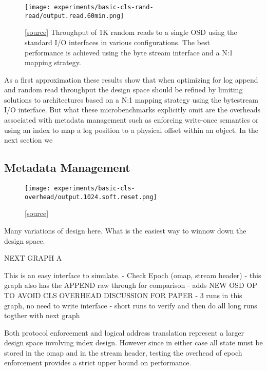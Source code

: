 \documentclass[10pt,twocolumn]{article}
\begin{document}
\begin{figure}[h]
  \centering
  \texttt{[image: experiments/basic-cls-rand-read/output.read.60min.png]}
  \caption{
[\href{https://github.com/noahdesu/zlog-popper/tree/master/experiments/basic-cls-rand-read/visualize.ipynb}{source}]
Throughput of 1K random reads to a single OSD using the standard I/O
interfaces in various configurations. The best performance is achieved using
the byte stream interface and a N:1 mapping strategy.
}
\end{figure}

As a first approximation these results show that when optimizing for log
append and random read throughput the design space should be refined by
limiting solutions to architectures based on a N:1 mapping strategy using the
bytestream I/O interface. But what these microbenchmarks explicitly omit are
the overheads associated with metadata management such as enforcing write-once
semantics or using an index to map a log position to a physical offset within
an object. In the next section we

\subsection{Metadata Management}

\begin{figure}[h]
  \centering
  \texttt{[image: experiments/basic-cls-overhead/output.1024.soft.reset.png]}
  \caption{
[\href{https://github.com/noahdesu/zlog-popper/tree/master/experiments/basic-cls-overhead/visualize.ipynb}{source}]
}
\end{figure}

Many variations of design here. What is the easiest way to 
winnow down the design space.

NEXT GRAPH A

This is an easy interface to simulate.
- Check Epoch (omap, stream header)
- this graph also has the APPEND raw through for comparison
- adds NEW OSD OP TO AVOID CLS OVERHEAD DISCUSSION FOR PAPER
- 3 runs in this graph, no need to write interface
- short runs to verify and then do all long runs togther with next graph

Both protocol enforcement and logical address translation
represent a larger design space involving index design. However
since in either case all state must be stored in the omap and
in the stream header, testing the overhead of epoch enforcement
provides a strict upper bound on performance.
\end{document}
